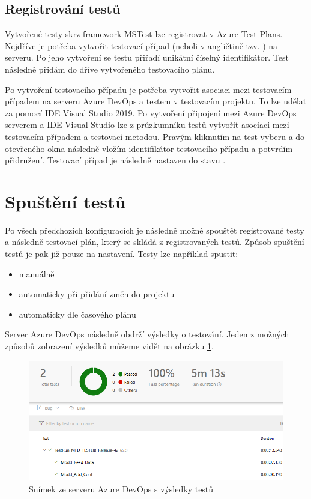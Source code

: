 \subsection{Registrování testů}
Vytvořené testy skrz framework MSTest lze registrovat v Azure Test Plans. Nejdříve je potřeba vytvořit testovací případ (neboli v angličtině tzv. ) na serveru. Po jeho vytvoření se testu přiřadí unikátní číselný identifikátor. Test následně přidám do dříve vytvořeného testovacího plánu.

Po vytvoření testovacího případu je potřeba vytvořit asociaci mezi testovacím případem na serveru Azure DevOps a testem v testovacím projektu. To lze udělat za pomocí IDE Visual Studio 2019. Po vytvoření připojení mezi Azure DevOps serverem a IDE Visual Studio lze z průzkumníku testů vytvořit asociaci mezi testovacím případem a testovací metodou. Pravým kliknutím na test vyberu  a do otevřeného okna následně vložím identifikátor testovacího případu a potvrdím přidružení. Testovací případ je následně nastaven do stavu .

\section{Spuštění testů}
Po všech předchozích konfiguracích je následně možné spouštět registrované testy a následně testovací plán, který se skládá z registrovaných testů. Způsob spuštění testů je pak již pouze na nastavení. Testy lze například spustit:

\begin{itemize}
    \item manuálně
    \item automaticky při přidání změn do projektu
    \item automaticky dle časového plánu
\end{itemize}

Server Azure DevOps následně obdrží výsledky o testování. Jeden z možných způsobů zobrazení výsledků můžeme vidět na obrázku \ref{fig:azure}.

\begin{figure}[htbp]
    \centering 
    \includegraphics[width=\textwidth]{assets/img/azure.png}
    \caption{Snímek ze serveru Azure DevOps s výsledky testů}
    \label{fig:azure}
\end{figure}



